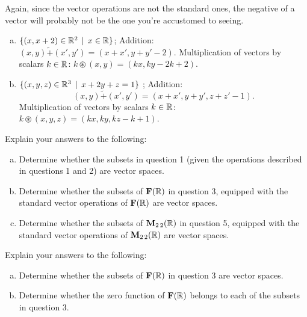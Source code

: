 \begin{prob}
Again, since the vector operations are not the standard ones, the negative of a vector will probably not be the one you're accustomed to seeing.

\begin{enumerate}[a)]
\medskip

\item  $\{(x, x+2) \in \mathbb{R}^2\,\mid \, x\in \mathbb{R} \}$;  Addition: $(x,y) \tilde+ (x',y')=(x+x', y+y'-2)$. Multiplication of vectors  by  scalars $k\in \mathbb{R}$: $k\circledast (x,y)=(kx, ky-2k+2)$.     \medskip
%
\item\sov  $\{(x, y, z) \in \mathbb{R}^3\,\mid \, x+2y+z=1  \}$ ;  Addition: $$(x,y) \tilde+ (x',y')=(x+x', y+y',z+z'-1).$$ Multiplication of vectors  by  scalars $k\in \mathbb{R}$: $k\circledast (x,y,z)=(kx, ky, kz-k+1)$. \medskip 
%
\end{enumerate}

\end{prob} \begin{prob} \label{prob04.10} Explain your answers to the following:

\begin{enumerate}[a)] 

\item\sov  Determine whether the subsets in  question 1  (given the operations described in questions 1 and 2)  are vector spaces. \medskip 
%

\item  Determine whether the  subsets  of $\mathbf{F}(\mathbb{R})$ in  question 3, equipped with the standard vector operations of  $\mathbf{F}(\mathbb{R})$ are vector spaces. \medskip 
% 
 
\item  Determine whether the subsets of $\mathbf{M}_{2 \,2}(\mathbb{R})$ in  question 5, equipped with the standard vector operations of $\mathbf{M}_{2 \,2}(\mathbb{R})$ are vector spaces. \medskip 
%
 
\end{enumerate}


\end{prob} \begin{prob} \label{prob04.11} Explain your answers to the following:

\begin{enumerate}[a)] 

\item\sov  Determine whether the subsets of $\mathbf{F}(\mathbb{R})$ in  question 3 are vector spaces. \medskip 
%

\item  Determine whether the  zero function  of $\mathbf{F}(\mathbb{R})$ belongs to each of the subsets in  question 3. \medskip 
%


\end{enumerate}
\end{prob}
